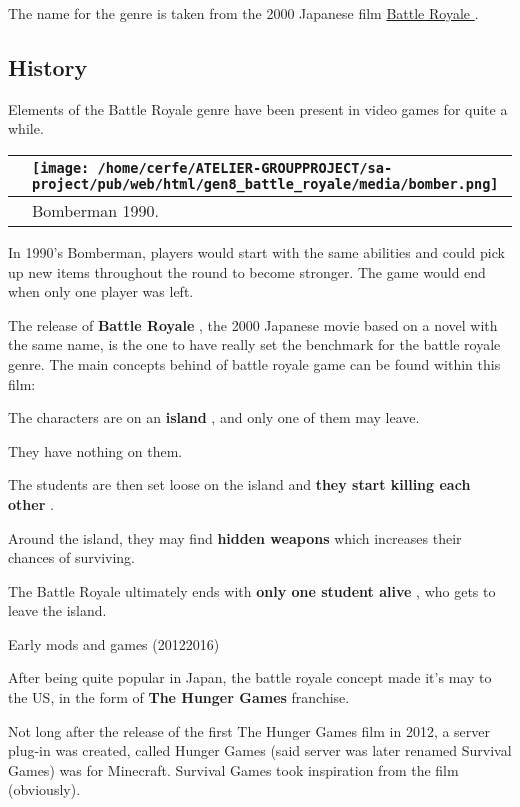 \documentclass[a4paper,10pt]{book}
\begin{document}
 
        The name for the genre is taken from the 2000 Japanese film  \href{https://en.wikipedia.org/wiki/Battle_Royale_(film)}{Battle Royale }.
     
 
 \subsection{History }
 
      Elements of the Battle Royale genre have been present in video games for quite a while.
     
 \begin{longtable}{p{1mm}|l|}\hline
 
 & \texttt{[image: /home/cerfe/ATELIER-GROUPPROJECT/sa-project/pub/web/html/gen8\_battle\_royale/media/bomber.png]}
 \\\hline
 
 & Bomberman 1990. 
 \\\hline
 \end{longtable}
 
      In 1990's Bomberman, players would start with the same abilities and could pick up new items throughout the round to become stronger.
      The game would end when only one player was left.
     
 
      The release of  \textbf{Battle Royale } , the 2000 Japanese movie based on a novel with the same name, is the one to have really set the benchmark for the battle royale genre.
      The main concepts behind of battle royale game can be found within this film:
       
      The characters are on an  \textbf{island } , and only one of them may leave.
       
      They have nothing on them.
       
      The students are then set loose on the island and  \textbf{they start killing each other } .
       
      Around the island, they may find  \textbf{hidden weapons }  which increases their chances of surviving.
       
      The Battle Royale ultimately ends with  \textbf{only one student alive } , who gets to leave the island.
       
 Early mods and games (20122016) 
 
      After being quite popular in Japan, the battle royale concept made it's may to the US, in the form of  \textbf{The Hunger Games }  franchise.
     
 
      Not long after the release of the first The Hunger Games film in 2012, a server plug-in was created, called Hunger Games (said server was later renamed Survival Games) was for Minecraft.
      Survival Games took inspiration from the film (obviously).
       
\end{document}
